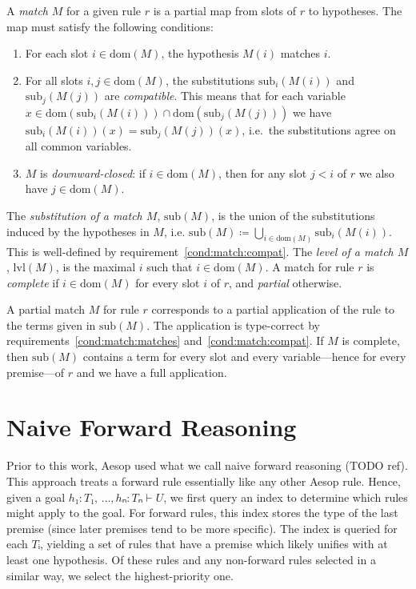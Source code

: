 \documentclass[runningheads]{llncs}
\newcommand{\dom}{\ensuremath{\mathrm{dom}}}
\newcommand{\sub}{\ensuremath{\mathrm{sub}}}
\newcommand{\lvl}{\ensuremath{\mathrm{lvl}}}
\begin{document}
A \textit{match} $M$ for a given rule $r$ is a partial map from slots of $r$ to hypotheses.
The map must satisfy the following conditions:
\begin{enumerate}
  \item\label{cond:match:matches} For each slot $i ∈ \dom(M)$, the hypothesis $M(i)$ matches $i$.
  \item\label{cond:match:compat} For all slots $i,j ∈ \dom(M)$, the substitutions $\sub_{i}(M(i))$ and $\sub_{j}(M(j))$ are \emph{compatible}.
        This means that for each variable $x ∈ \dom(\sub_{i}(M(i))) ∩ \dom(\sub_{j}(M(j)))$ we have $\sub_{i}(M(i))(x) = \sub_{j}(M(j))(x)$, i.e.\ the substitutions agree on all common variables.
  \item\label{cond:match:closed} $M$ is \emph{downward-closed}: if $i ∈ \dom(M)$, then for any slot $j < i$ of $r$ we also have $j ∈ \dom(M)$.
\end{enumerate}
The \emph{substitution of a match $M$}, $\sub(M)$, is the union of the substitutions induced by the hypotheses in $M$, i.e. $\sub(M) ≔ ⋃_{i ∈ \dom(M)}\sub_{i}(M(i))$.
This is well-defined by requirement~\ref{cond:match:compat}.
The \textit{level of a match $M$}, $\lvl(M)$, is the maximal $i$ such that $i ∈ \dom(M)$.
A match for rule $r$ is \textit{complete} if $i ∈ \dom(M)$ for every slot $i$ of $r$, and \emph{partial} otherwise.

A partial match $M$ for rule $r$ corresponds to a partial application of the rule to the terms given in $\sub(M)$.
The application is type-correct by requirements~\ref{cond:match:matches} and~\ref{cond:match:compat}.
If $M$ is complete, then $\sub(M)$ contains a term for every slot and every variable---hence for every premise---of $r$ and we have a full application.

\section{Naive Forward Reasoning}

Prior to this work, Aesop used what we call naive forward reasoning (TODO ref).
This approach treats a forward rule essentially like any other Aesop rule.
Hence, given a goal $h₁ : T₁,\, \dots, hₙ : Tₙ ⊢ U$, we first query an index to determine which rules might apply to the goal.
For forward rules, this index stores the type of the last premise (since later premises tend to be more specific).
The index is queried for each $Tᵢ$, yielding a set of rules that have a premise which likely unifies with at least one hypothesis.
Of these rules and any non-forward rules selected in a similar way, we select the highest-priority one.
\end{document}

